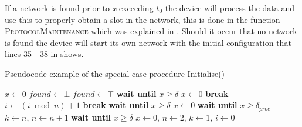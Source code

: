 If a network is found prior to \textit{x} exceeding $t_0$ the device will process the data and use this to properly obtain a slot in the network, this is done in the function \textsc{ProtocolMaintenance} which was explained in .
Should it occur that no network is found the device will start its own network with the initial configuration that lines 35 - 38 in  shows.

\begin{algorithm}[h]
\caption{Pseudocode example of the special case procedure Initialise()}
\label{lst:setupCCRC}
\begin{algorithmic}[1]
    \State $x \gets 0$
    \State $found \gets \bot$
            \State {} 
            \State $found \gets \top$
            \State \textbf{wait until } $x \ge \delta$
            \State $x \gets 0$
            \State \textbf{break}
        \EndIf                                        
    \EndWhile
            \State $i \gets (i \bmod n) + 1$
                    \State {}
                    \State \textbf{break}
                \EndIf
            \EndWhile
            \State \textbf{wait until } $x \ge \delta$
            \State $x \gets 0$ 
        \EndWhile
        \State \textbf{wait until } $x \ge \delta_{proc}$
        \State $k \gets n,\, n \gets n+1$ 
        \State {}  
        \State \textbf{wait until } $x \ge \delta$ 
    \Else
        \State $x \gets 0,\, n \gets 2,\, k \gets 1,\, i \gets 0$ 
    \EndIf
    \State {} 
\EndProcedure        
\end{algorithmic}    
\end{algorithm} 


